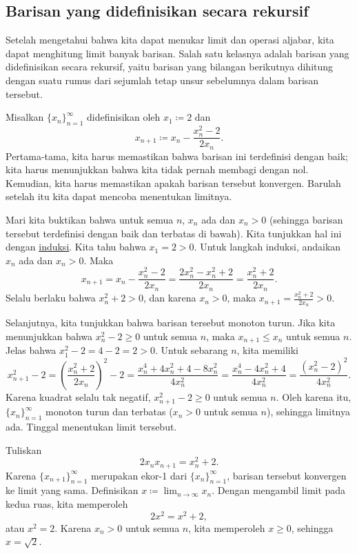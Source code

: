\subsection{Barisan yang didefinisikan secara rekursif}

Setelah mengetahui bahwa kita dapat menukar limit dan operasi aljabar, kita dapat
menghitung limit banyak barisan.
Salah satu kelasnya adalah barisan yang didefinisikan secara rekursif, yaitu barisan yang
bilangan berikutnya dihitung dengan suatu rumus dari sejumlah tetap
unsur sebelumnya dalam barisan tersebut.

\begin{example}
Misalkan $\{ x_n \}_{n=1}^\infty$ didefinisikan oleh $x_1 \coloneqq 2$ dan
\begin{equation*}
x_{n+1} \coloneqq x_n - \frac{x_n^2-2}{2x_n} .
\end{equation*}
Pertama-tama, kita harus memastikan bahwa barisan ini terdefinisi dengan baik; kita harus menunjukkan bahwa kita tidak pernah
membagi dengan nol.
Kemudian, kita harus memastikan apakah barisan tersebut konvergen.  Barulah setelah itu
kita dapat mencoba menentukan limitnya.

Mari kita buktikan bahwa untuk semua $n$,
$x_n$ ada dan $x_n > 0$
(sehingga barisan tersebut terdefinisi dengan baik dan terbatas di bawah).
Kita tunjukkan hal ini dengan \hyperref[induction:thm]{induksi}.  Kita tahu bahwa
$x_1 = 2 > 0$.  Untuk langkah induksi, andaikan $x_n$ ada dan
$x_n > 0$.  Maka
\begin{equation*}
x_{n+1} = x_n - \frac{x_n^2-2}{2x_n} =
\frac{2x_n^2 - x_n^2+2}{2x_n} =
\frac{x_n^2+2}{2x_n} .
\end{equation*}
Selalu berlaku bahwa $x_n^2+2 > 0$,
dan karena
$x_n > 0$, maka $x_{n+1} = \frac{x_n^2+2}{2x_n} > 0$.

Selanjutnya, kita
tunjukkan bahwa barisan tersebut monoton turun.  Jika kita menunjukkan bahwa
$x_n^2-2 \geq 0$ untuk semua $n$, maka $x_{n+1} \leq x_n$ untuk semua $n$.
Jelas bahwa $x_1^2-2 = 4-2 = 2 > 0$.  Untuk sebarang $n$, kita memiliki
\begin{equation*}
x_{n+1}^2-2 =
{\left( \frac{x_n^2+2}{2x_n} \right)}^2 - 2
=
\frac{x_n^4+4x_n^2+4 - 8x_n^2}{4x_n^2}
=
\frac{x_n^4-4x_n^2+4}{4x_n^2}
=
\frac{{\left( x_n^2-2 \right)}^2}{4x_n^2} .
\end{equation*}
Karena kuadrat selalu tak negatif,
$x_{n+1}^2-2 \geq 0$ untuk semua $n$.  Oleh karena itu,
$\{ x_n \}_{n=1}^\infty$ monoton turun dan terbatas ($x_n > 0$ untuk semua $n$), sehingga
limitnya ada.  Tinggal menentukan limit tersebut.

Tuliskan
\begin{equation*}
2x_nx_{n+1} = x_n^2+2 .
\end{equation*}
Karena $\{ x_{n+1} \}_{n=1}^\infty$ merupakan ekor-1 dari $\{ x_n \}_{n=1}^\infty$, barisan tersebut konvergen ke
limit yang sama.  Definisikan $x \coloneqq \lim_{n\to\infty} x_n$.  Dengan mengambil limit pada
kedua ruas, kita memperoleh
\begin{equation*}
2x^2 = x^2+2 ,
\end{equation*}
atau $x^2 = 2$.  Karena $x_n > 0$ untuk semua $n$, kita memperoleh $x \geq 0$, sehingga $x = \sqrt{2}$.
\end{example}

